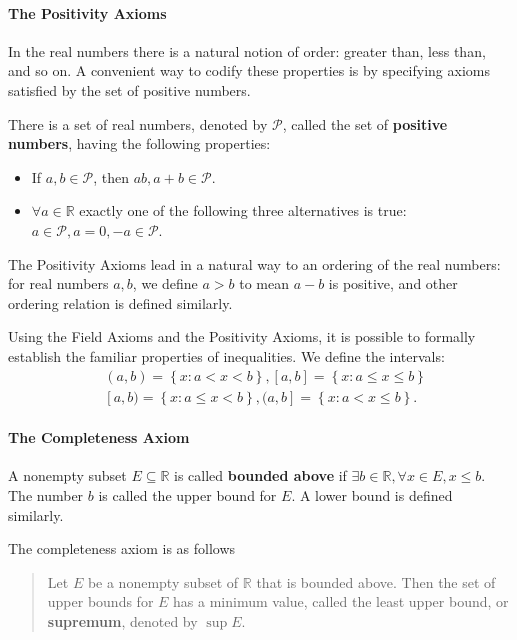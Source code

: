 \documentclass[../main.tex]{subfiles}
\begin{document}
\paragraph{The Positivity Axioms}
In the real numbers there is a natural notion of order: greater than, less than, and so on. A convenient way to codify these properties is by specifying axioms satisfied by the set of positive numbers.

There is a set of real numbers, denoted by $\mathcal{P}$, called the set of \textbf{positive numbers}, having the following properties:
\begin{itemize}
	\item If $a,b\in \mathcal{P}$, then $ab, a+b \in \mathcal{P}$.
	\item $\forall a\in \mathbb{R}$ exactly one of the following three alternatives is true: $a \in \mathcal{P}, a = 0, -a\in \mathcal{P}$.
\end{itemize}

The Positivity Axioms lead in a natural way to an ordering of the real numbers: for real numbers $a,b$, we define $a>b$ to mean $a-b$ is positive, and other ordering relation is defined similarly.

Using the Field Axioms and the Positivity Axioms, it is possible to formally establish the familiar properties of inequalities. We define the intervals:
\begin{equation}
	\begin{aligned}
		 & (a,b) = \left\{ x:a<x<b \right\}, [a,b] = \left\{ x:a\leq x\leq b \right\} \\
		 & [a,b) = \left\{ x:a\leq x<b \right\},(a,b] = \left\{ x:a<x\leq b \right\}.
	\end{aligned}
\end{equation}

\paragraph{The Completeness Axiom} A nonempty subset $E \subseteq \mathbb{R}$ is called \textbf{bounded above} if $\exists b\in \mathbb{R}, \forall x\in E, x \leq b$. The number $b$ is called the upper bound for $E$. A lower bound is defined similarly.

The completeness axiom is as follows
\begin{quote}
	Let $E$ be a nonempty subset of $\mathbb{R}$ that is bounded above. Then the set of upper bounds for $E$ has a minimum value, called the least upper bound, or \textbf{supremum}, denoted by $\sup E$.
\end{quote}
\end{document}
